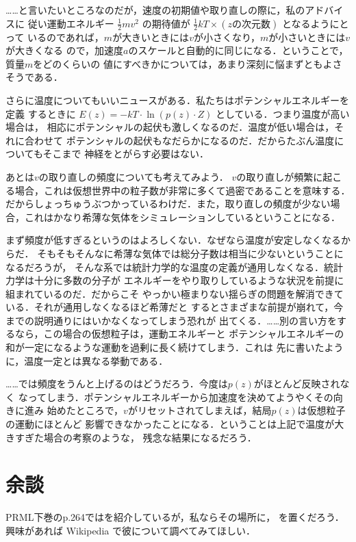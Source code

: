  ……と言いたいところなのだが，速度の初期値や取り直しの際に，私のアドバイスに
従い運動エネルギー $\frac{1}{2} m v^2$ の期待値が $\frac{1}{2} kT \times (zの次元数)$ となるようにとって
いるのであれば，$m$が大きいときには$v$が小さくなり，$m$が小さいときには$v$が大きくなる
ので，加速度$a$のスケールと自動的に同じになる．ということで，質量$m$をどのくらいの
値にすべきかについては，あまり深刻に悩まずともよさそうである．

  さらに温度についてもいいニュースがある．私たちはポテンシャルエネルギーを定義
するときに $E(z) = - kT \cdot \ln{( p(z) \cdot Z )}$ としている．つまり温度が高い場合は，
相応にポテンシャルの起伏も激しくなるのだ．温度が低い場合は，それに合わせて
ポテンシャルの起伏もなだらかになるのだ．だからたぶん温度についてもそこまで
神経をとがらす必要はない．

  あとは$v$の取り直しの頻度についても考えてみよう．
$v$の取り直しが頻繁に起こる場合，これは仮想世界中の粒子数が非常に多くて過密であることを意味する．だからしょっちゅうぶつかっているわけだ．また，取り直しの頻度が少ない場合，これはかなり希薄な気体をシミュレーションしているということになる．

  まず頻度が低すぎるというのはよろしくない．なぜなら温度が安定しなくなるからだ．
そもそもそんなに希薄な気体では総分子数は相当に少ないということになるだろうが，
そんな系では統計力学的な温度の定義が通用しなくなる．統計力学は十分に多数の分子が
エネルギーをやり取りしているような状況を前提に組まれているのだ．だからこそ
やっかい極まりない揺らぎの問題を解消できている．それが通用しなくなるほど希薄だと
するとさまざまな前提が崩れて，今までの説明通りにはいかなくなってしまう恐れが
出てくる．……別の言い方をするなら，この場合の仮想粒子は，運動エネルギーと
ポテンシャルエネルギーの和が一定になるような運動を過剰に長く続けてしまう．これは
先に書いたように，温度一定とは異なる挙動である．

  ……では頻度をうんと上げるのはどうだろう．今度は$p(z)$がほとんど反映されなく
なってしまう．ポテンシャルエネルギーから加速度を決めてようやくその向きに進み
始めたところで，$v$がリセットされてしまえば，結局$p(z)$は仮想粒子の運動にほとんど
影響できなかったことになる．ということは上記で温度が大きすぎた場合の考察のような，
残念な結果になるだろう．


\section{余談}

  PRML下巻のp.264ではを紹介しているが，私ならその場所に，
を置くだろう．
興味があれば Wikipedia で彼について調べてみてほしい．


